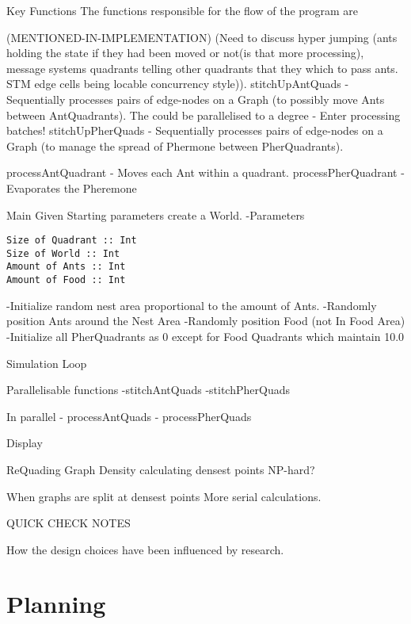 \documentclass[main.tex]{subfiles}
\begin{document}
Key Functions
The functions responsible for the flow of the program are


(MENTIONED-IN-IMPLEMENTATION) (Need to discuss hyper jumping (ants holding the state if they had been moved or not(is that more processing), message systems quadrants telling other quadrants that they which to pass ants. STM edge cells being locable concurrency style)).
stitchUpAntQuads - Sequentially processes pairs of edge-nodes on a Graph (to possibly move Ants between AntQuadrants).
The could be parallelised to a degree - Enter processing batches!
stitchUpPherQuads - Sequentially processes pairs of edge-nodes on a Graph (to manage the spread of Phermone between PherQuadrants).

processAntQuadrant - Moves each Ant within a quadrant.
processPherQuadrant - Evaporates the Pheremone 


Main
Given Starting parameters create a World.
-Parameters

\begin{lstlisting}
Size of Quadrant :: Int
Size of World :: Int
Amount of Ants :: Int
Amount of Food :: Int

\end{lstlisting}


-Initialize random nest area proportional to the amount of Ants.
-Randomly position Ants around the Nest Area
-Randomly position Food (not In Food Area)
-Initialize all PherQuadrants as 0 except for Food Quadrants which maintain 10.0

Simulation Loop

Parallelisable functions
-stitchAntQuads
-stitchPherQuads

In parallel
- processAntQuads
- processPherQuads

Display


ReQuading 
Graph Density
calculating densest points NP-hard?

When graphs are split at densest points
More serial calculations.

QUICK CHECK NOTES



How the design choices have been influenced by research.

\section{Planning}
\end{document}
